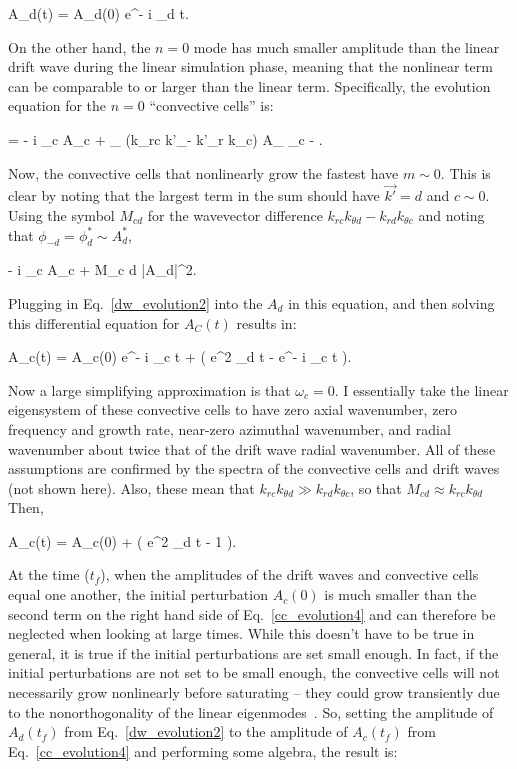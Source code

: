 \beq
\label{dw_evolution2}
A_d(t) = A_d(0) e^{- i \omega_d t}.
\eeq

On the other hand, the $n=0$ mode has much smaller amplitude than the linear drift wave during the linear simulation phase, meaning that the nonlinear term can be comparable to or larger than
the linear term. Specifically, the evolution equation for the $n=0$ ``convective cells'' is:

\beq
\label{cc_evolution1}
 = - i \omega_c A_c + \sum_{} (k_{rc} k'_\theta - k'_r k_{\theta c}) A_{} \phi_{c - }.
\eeq

Now, the convective cells that nonlinearly grow the fastest have $m \sim 0$. This is clear by noting that the largest term in the sum should have $\vec{k'} = d$ and $c \sim 0$. 
Using the symbol $M_{c d}$ for the wavevector difference $k_{r c} k_{\theta d} - k_{r d} k_{\theta c}$ and noting that $\phi_{-d} = \phi^*_d \sim A_d^*$,

\beq
\label{cc_evolution2}
 \approx - i \omega_c A_c + M_{c d} |A_d|^2.
\eeq

Plugging in Eq.~\ref{dw_evolution2} into the $A_d$ in this equation, and then solving this differential equation for $A_C(t)$ results in:

\beq
\label{cc_evolution3}
A_c(t) = A_c(0) e^{- i \omega_c t} +  \left( e^{2 \gamma_d t} - e^{- i \omega_c t}  \right).
\eeq

Now a large simplifying approximation is that $\omega_c = 0$. I essentially take the linear eigensystem of these convective cells to have zero axial wavenumber, zero frequency and growth rate, 
near-zero azimuthal wavenumber, and radial wavenumber about twice that of the drift wave radial wavenumber. All of these assumptions are confirmed by the spectra of the convective cells and
drift waves (not shown here). Also, these mean that $k_{r c} k_{\theta d} \gg k_{r d} k_{\theta c}$, so that $M_{c d} \approx k_{r c} k_{\theta d}$ Then,

\beq
\label{cc_evolution4}
A_c(t) = A_c(0) +  \left( e^{2 \gamma_d t} - 1  \right).
\eeq

At the time ($t_f$), when the amplitudes of the drift waves and convective cells equal one another, the initial perturbation $A_c(0)$ is much smaller than the second term on the right hand side
of Eq.~\ref{cc_evolution4} and can therefore be neglected when looking at large times. While this doesn't have to be true in general, it is true if the initial perturbations are set small enough.
In fact, if the initial perturbations are not set to be small enough, the convective cells will not necessarily grow nonlinearly before saturating -- they could grow transiently due to the
nonorthogonality of the linear eigenmodes~\cite{camargo1998,cohen2009}.
So, setting the amplitude of $A_d(t_f)$ from Eq.~\ref{dw_evolution2} to the amplitude of 
$A_c(t_f)$ from Eq.~\ref{cc_evolution4} and performing some algebra, the result is:

